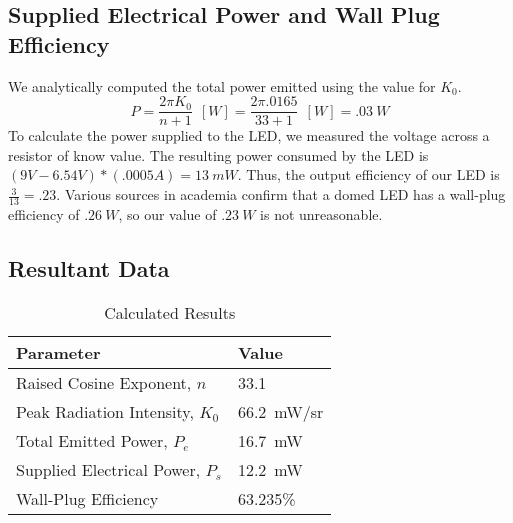 \subsection{Supplied Electrical Power and Wall Plug Efficiency}
We analytically computed the total power emitted using the value for $K_0$.
\[P = \frac{2 \pi K_{0}}{n+1}\: \: [W] =  \frac{2 \pi .0165} {33+1}\: \: [W] = \SI{.03}{W}\]
To calculate the power supplied to the LED, we measured the voltage across a resistor of know value. The resulting power consumed by the LED is $(9V - 6.54V)*(.0005A) = \SI{13}{mW}$. 
Thus, the output efficiency of our LED is $\frac{3}{13} = .23$. Various sources in academia confirm that a domed LED has a wall-plug efficiency of $\SI{.26}{W}$, so our value of $\SI{.23}{W}$ is not unreasonable.

\subsection{Resultant Data}

\begin{table}[!htb]
\caption{Calculated Results} \label{tab:calc_results}
\bigskip
\centering
\begin{tabular}{l|l}
\rowcolor[HTML]{C0C0C0} 
\textbf{Parameter} & \textbf{Value} \\ \hline
Raised Cosine Exponent, $n$ & 33.1 \\
Peak Radiation Intensity, $K_0$ & \SI{66.2}{mW/sr} \\
Total Emitted Power, $P_e$ & \SI{16.7}{mW} \\
Supplied Electrical Power, $P_s$ & \SI{12.2}{mW} \\
Wall-Plug Efficiency & 63.235\%
\end{tabular}
\end{table}

